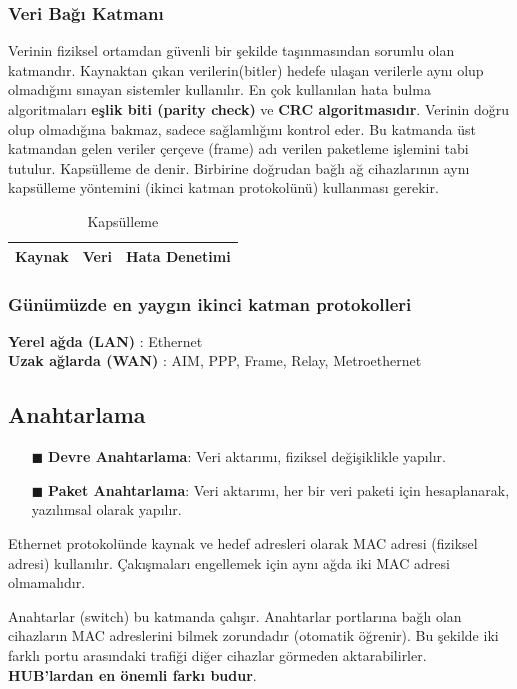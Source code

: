 \subsubsection{Veri Bağı Katmanı}\label{subsubsec:veri_bagi_katmani}
Verinin fiziksel ortamdan güvenli bir şekilde taşınmasından sorumlu olan katmandır.
Kaynaktan çıkan verilerin(bitler) hedefe ulaşan verilerle aynı olup olmadığını sınayan sistemler kullanılır.
En çok kullanılan hata bulma algoritmaları \textbf{eşlik biti (parity check)} ve \textbf{CRC algoritmasıdır}.
Verinin doğru olup olmadığına bakmaz, sadece sağlamlığını kontrol eder.
Bu katmanda üst katmandan gelen veriler çerçeve (frame) adı verilen paketleme işlemini tabi tutulur.
Kapsülleme de denir.
Birbirine doğrudan bağlı ağ cihazlarının aynı kapsülleme yöntemini (ikinci katman protokolünü) kullanması gerekir.

\begin{table}[h]
	\centering
	\begin{tabular}{|c|c|c|}
		\hline
		Kaynak & Veri & Hata Denetimi \\
		\hline
	\end{tabular}
	\caption{Kapsülleme}
	\label{tab:table_kapsulleme}
\end{table}

\subsubsection*{Günümüzde en yaygın ikinci katman protokolleri}
\textbf{Yerel ağda (LAN)} : Ethernet \\
\textbf{Uzak ağlarda (WAN)} : AIM, PPP, Frame, Relay, Metroethernet
\subsection*{Anahtarlama}
\begin{enumerate}
	\item[$\blacksquare$] \textbf{Devre Anahtarlama}: Veri aktarımı, fiziksel değişiklikle yapılır.
	\item[$\blacksquare$] \textbf{Paket Anahtarlama}: Veri aktarımı, her bir veri paketi için hesaplanarak, yazılımsal olarak yapılır.
\end{enumerate}
Ethernet protokolünde kaynak ve hedef adresleri olarak MAC adresi (fiziksel adresi) kullanılır. Çakışmaları engellemek için aynı ağda iki MAC adresi olmamalıdır.

Anahtarlar (switch) bu katmanda çalışır.
Anahtarlar portlarına bağlı olan cihazların MAC adreslerini bilmek zorundadır (otomatik öğrenir).
Bu şekilde iki farklı portu arasındaki trafiği diğer cihazlar görmeden aktarabilirler. \textbf{HUB'lardan en önemli farkı budur}.

